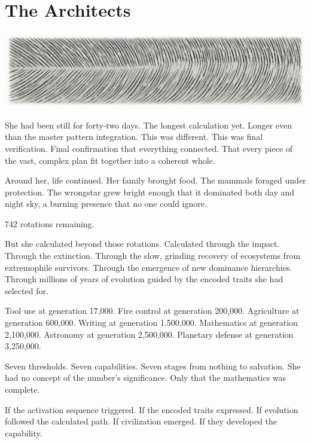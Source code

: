 \chapter{The Architects}
\label{ch:10}



\begin{center}
\includegraphics[width=\textwidth]{images/chapterImages/genesis_sketch_00085_.png}
\end{center}

She had been still for forty-two days. The longest calculation yet. Longer even than the master pattern integration. This was different. This was final verification. Final confirmation that everything connected. That every piece of the vast, complex plan fit together into a coherent whole.

Around her, life continued. Her family brought food. The mammals foraged under protection. The wrongstar grew bright enough that it dominated both day and night sky, a burning presence that no one could ignore.

742 rotations remaining.

But she calculated beyond those rotations. Calculated through the impact. Through the extinction. Through the slow, grinding recovery of ecosystems from extremophile survivors. Through the emergence of new dominance hierarchies. Through millions of years of evolution guided by the encoded traits she had selected for.

Tool use at generation 17,000.
Fire control at generation 200,000.
Agriculture at generation 600,000.
Writing at generation 1,500,000.
Mathematics at generation 2,100,000.
Astronomy at generation 2,500,000.
Planetary defense at generation 3,250,000.

Seven thresholds. Seven capabilities. Seven stages from nothing to salvation. She had no concept of the number's significance. Only that the mathematics was complete.

If the activation sequence triggered. If the encoded traits expressed. If evolution followed the calculated path. If civilization emerged. If they developed the capability.

